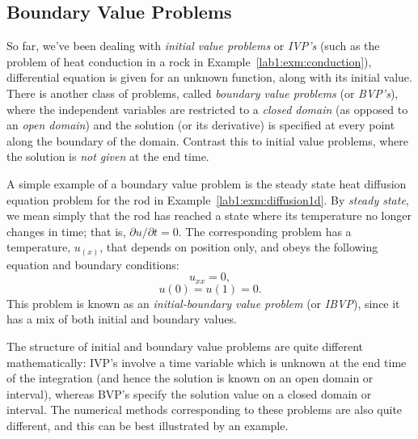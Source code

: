\subsection{Boundary Value Problems}
\label{lab1:sec:bvp}

So far, we've been dealing with \emph{initial value problems} or \emph{IVP's}
(such as 
the problem of heat conduction in a rock in
Example~\ref{lab1:exm:conduction}),
differential equation is given for an unknown function, along with its
initial value.  There is another class of problems, called {\em
  boundary value problems} (or \emph{BVP's}),  where the independent variables are
restricted to a \emph{closed domain} (as opposed to an \emph{open domain}) 
and the solution (or its
derivative) is specified at every point along the boundary of the
domain.  Contrast this to initial value problems, where the solution
is \emph{not given} at the end time.

A simple example of a boundary value problem is the steady
state heat diffusion equation problem for the rod in
Example~\ref{lab1:exm:diffusion1d}.  By \emph{steady state}, we mean
simply that the rod has reached a state where its temperature no
longer changes in time; that is, $\partial u/\partial t = 0$.  The
corresponding 
problem has a temperature, $u_(x)$, that depends on position only, and
obeys the following equation and boundary conditions:
\[ u_{xx} = 0, \]
\[ u(0) = u(1) = 0. \]
This problem is known as an \emph{initial-boundary value problem} (or
\emph{IBVP}), since it has a mix of both initial and boundary values. 

The structure of initial and boundary value problems are quite
different mathematically: IVP's involve a time variable which is
unknown at the end 
time of the integration (and hence the solution is known on an open
domain or interval), whereas BVP's specify the solution value on 
a closed domain or interval.  The 
numerical methods corresponding to these problems are also quite
different, and this can be best illustrated by an example.

